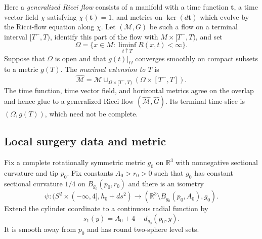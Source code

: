 \begin{definition}
\label{def:maximal-ricci-flow-extension}
\notready
Here a \emph{generalized Ricci flow} consists of a manifold with a time
function $\mathbf t$, a time vector field $\chi$ satisfying
$\chi(\mathbf t)=1$, and metrics on $\ker(d\mathbf t)$ which evolve by
the Ricci-flow equation along $\chi$.  Let $(\mathcal M,G)$ be such a
flow on a terminal interval
$[T^-,T)$, identify this part of the flow with $M\times[T^-,T)$, and set
\[
 \Omega=\{x\in M:\liminf_{t\uparrow T}R(x,t)<\infty\}.
\]
Suppose that $\Omega$ is open and that $g(t)|_\Omega$ converges smoothly
on compact subsets to a metric $g(T)$.  The \emph{maximal extension to
$T$} is
\[
 \widehat{\mathcal M}
 =\mathcal M\cup_{\Omega\times[T^-,T)}
   (\Omega\times[T^-,T]).
\]
The time function, time vector field, and horizontal metrics agree on the
overlap and hence glue to a generalized Ricci flow
$(\widehat{\mathcal M},\widehat G)$.  Its terminal time-slice is
$(\Omega,g(T))$, which need not be complete.
\end{definition}

\subsection{Local surgery data and metric}

\begin{definition}
\label{def:standard-surgery-cap-model}
\notready
Fix a complete rotationally symmetric metric $g_0$ on $\mathbb R^3$ with
nonnegative sectional curvature and tip $p_0$.  Fix constants
$A_0>r_0>0$ such that $g_0$ has constant sectional curvature $1/4$ on
$B_{g_0}(p_0,r_0)$ and there is an isometry
\[
 \psi\colon(S^2\times(-\infty,4],h_0+ds^2)
 \longrightarrow(\mathbb R^3\setminus B_{g_0}(p_0,A_0),g_0).
\]
Extend the cylinder coordinate to a continuous radial function by
\[
 s_1(y)=A_0+4-d_{g_0}(p_0,y).
\]
It is smooth away from $p_0$ and has round two-sphere level sets.
\end{definition}

